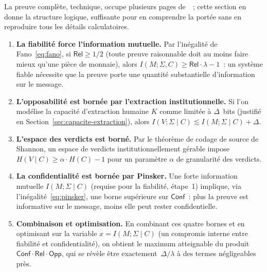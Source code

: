 La preuve complète, technique, occupe plusieurs pages
de~\cite{minka2026conditional}~; cette section en donne la structure
logique, suffisante pour en comprendre la portée sans en reproduire
tous les détails calculatoires.

\begin{enumerate}
    \item \textbf{La fiabilité force l'information mutuelle.}
          Par l'inégalité de Fano~\eqref{eq:fano}, si
          $\mathsf{Rel} \geq 1/2$ (toute preuve raisonnable doit
          au moins faire mieux qu'une pièce de monnaie), alors
          $I(M; \Sigma, C) \geq \mathsf{Rel} \cdot \lambda - 1$~:
          un système fiable nécessite que la preuve porte une
          quantité substantielle d'information sur le message.
    \item \textbf{L'opposabilité est bornée par l'extraction
          institutionnelle.} Si l'on modélise la capacité
          d'extraction humaine $K$ comme limitée à $\Delta$~bits
          (justifié en Section~\ref{sec:capacite-extraction}),
          alors $I(V;\Sigma\mid C) \lesssim I(M;\Sigma\mid C) + \Delta$.
    \item \textbf{L'espace des verdicts est borné.} Par le théorème
          de codage de source de Shannon, un espace de verdicts
          institutionnellement gérable impose
          $H(V \mid C) \geq \alpha \cdot H(C) - 1$ pour un paramètre
          $\alpha$ de granularité des verdicts.
    \item \textbf{La confidentialité est bornée par Pinsker.} Une
          forte information mutuelle $I(M;\Sigma\mid C)$ (requise
          pour la fiabilité, étape~1) implique, via
          l'inégalité~\eqref{eq:pinsker}, une borne supérieure sur
          $\mathsf{Conf}$~: plus la preuve est informative sur le
          message, moins elle peut rester confidentielle.
    \item \textbf{Combinaison et optimisation.} En combinant ces
          quatre bornes et en optimisant sur la variable
          $x = I(M;\Sigma\mid C)$ (un compromis interne entre
          fiabilité et confidentialité), on obtient le maximum
          atteignable du produit
          $\mathsf{Conf} \cdot \mathsf{Rel} \cdot \mathsf{Opp}$,
          qui se révèle être exactement~$\Delta/\lambda$ à des
          termes négligeables près.
\end{enumerate}


